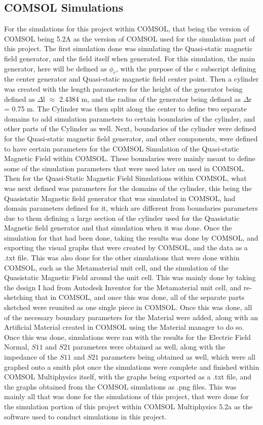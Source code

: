 \documentclass[]{article}
\begin{document}
\subsection*{COMSOL Simulations}
For the simulations for this project within COMSOL, that being the version of COMSOL being 5.2A as the version of COMSOL used for the simulation part of this project. The first simulation done was simulating the Quasi-static magnetic field generator, and the field itself when generated. For this simulation, the main generator, here will be defined as $\phi_c$, with the purpose of the c subscript defining the center generator and Quasi-static magnetic field center point. Then a cylinder was created with the length parameters for the height of the generator being defined as $\Delta$l $\approx$ 2.4384 m, and the radius of the generator being defined as $\Delta$r = 0.75 m. The Cylinder was then split along the center to define two separate domains to add simulation parameters to certain boundaries of the cylinder, and other parts of the Cylinder as well. Next, boundaries of the cylinder were defined for the Quasi-static magnetic field generator, and other components, were defined to have certain parameters for the COMSOL Simulation of the Quasi-static Magnetic Field within COMSOL. These boundaries were mainly meant to define some of the simulation parameters that were used later on used in COMSOL. Then for the Quasi-Static Magnetic Field Simulations within COMSOL, what was next defined was parameters for the domains of the cylinder, this being the Quasistatic Magnetic field generator that was simulated in COMSOL, had domain parameters defined for it, which are different from boundaries parameters due to them defining a large section of the cylinder used for the Quasistatic Magnetic field generator and that simulation when it was done. Once the simulation for that had been done, taking the results was done by COMSOL, and exporting the visual graphs that were created by COMSOL, and the data as a .txt file. This was also done for the other simulations that were done within COMSOL, such as the Metamaterial unit cell, and the simulation of the Quasistatic Magnetic Field around the unit cell. This was mainly done by taking the design I had from Autodesk Inventor for the Metamaterial unit cell, and re-sketching that in COMSOL, and once this was done, all of the separate parts sketched were reunited as one single piece in COMSOL. Once this was done, all of the necessary boundary parameters for the Material were added, along with an Artificial Material created in COMSOL using the Material manager to do so. Once this was done, simulations were ran with the results for the Electric Field Normal, $S11$ and $S21$ parameters were obtained as well, along with the impedance of the $S11$ and $S21$ parameters being obtained as well, which were all graphed onto a smith plot once the simulations were complete and finished within COMSOL Multiphysics itself, with the graphs being exported as a .txt file, and the graphs obtained from the COMSOL simulations as .png files. This was mainly all that was done for the simulations of this project, that were done for the simulation portion of this project within COMSOL Multiphysics 5.2a as the software used to conduct simulations in this project.
\end{document}
